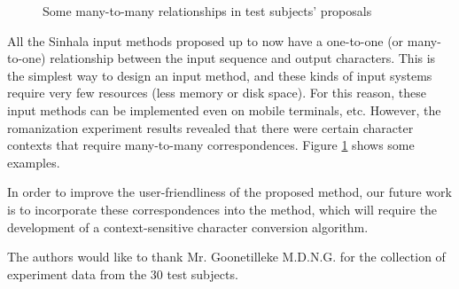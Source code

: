 \documentclass[english]{jnlp_1.3e}
\begin{document}
\begin{figure}[b]

\caption{Some many-to-many relationships in test subjects' proposals}
\label{fig:many-to-many}
\end{figure}

All the Sinhala input methods proposed up to now have a one-to-one (or many-to-one) relationship between  the  input sequence and output characters. 
This is the simplest way to design an input method,  and these kinds of input systems require very  few  resources (less memory or disk space). 
 For  this reason, these input methods can be implemented even on mobile terminals,  etc. 
However, the romanization experiment results revealed that there were certain character contexts that require many-to-many correspondences.
Figure \ref{fig:many-to-many}  shows some examples.

In order to improve the user-friendliness of the proposed method, our future work is to incorporate these correspondences into the method, 
which will require the development of a context-sensitive character conversion algorithm.



\acknowledgment

The authors would like to thank Mr. Goonetilleke M.D.N.G. for the collection of experiment data from the 30 test subjects.
\end{document}
